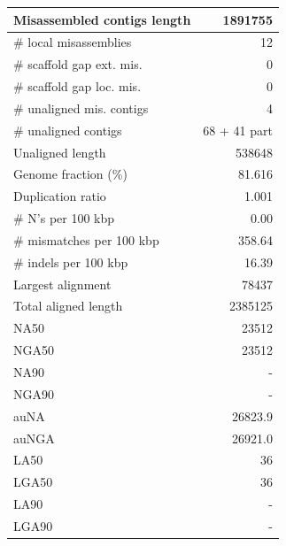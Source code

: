 \documentclass[12pt,a4paper]{article}
\begin{document}
\begin{table}[ht]
\begin{center}
\begin{tabular}{|l*{1}{|r}|}
Misassembled contigs length & 1891755 \\ \hline
\# local misassemblies & 12 \\ \hline
\# scaffold gap ext. mis. & 0 \\ \hline
\# scaffold gap loc. mis. & 0 \\ \hline
\# unaligned mis. contigs & 4 \\ \hline
\# unaligned contigs & 68 + 41 part \\ \hline
Unaligned length & 538648 \\ \hline
Genome fraction (\%) & 81.616 \\ \hline
Duplication ratio & 1.001 \\ \hline
\# N's per 100 kbp & 0.00 \\ \hline
\# mismatches per 100 kbp & 358.64 \\ \hline
\# indels per 100 kbp & 16.39 \\ \hline
Largest alignment & 78437 \\ \hline
Total aligned length & 2385125 \\ \hline
NA50 & 23512 \\ \hline
NGA50 & 23512 \\ \hline
NA90 & - \\ \hline
NGA90 & - \\ \hline
auNA & 26823.9 \\ \hline
auNGA & 26921.0 \\ \hline
LA50 & 36 \\ \hline
LGA50 & 36 \\ \hline
LA90 & - \\ \hline
LGA90 & - \\ \hline
\end{tabular}
\end{center}
\end{table}
\end{document}

